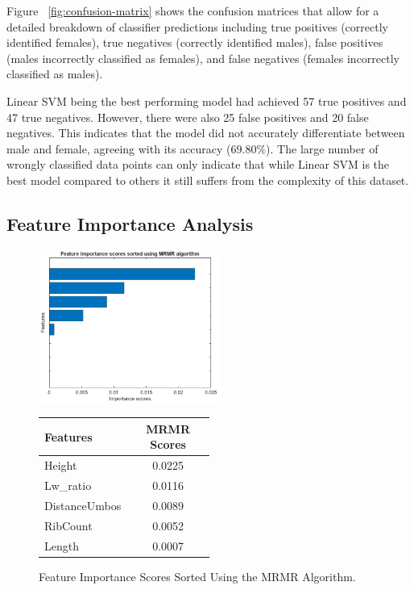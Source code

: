 Figure ~\ref{fig:confusion-matrix} shows the confusion matrices that allow for a detailed breakdown of classifier predictions including true positives (correctly identified females), true negatives (correctly identified males), false positives (males incorrectly classified as females), and false negatives (females incorrectly classified as males).

Linear SVM being the best performing model had achieved 57 true positives and 47 true negatives. However, there were also 25 false positives and 20 false negatives. This indicates that the model did not accurately differentiate  between male and female, agreeing with its accuracy (69.80\%). The large number of wrongly classified data points can only indicate that while Linear SVM is the best model compared to others it still suffers from the complexity of this dataset. 

\newpage
\subsection{Feature Importance Analysis}

\begin{figure}[!htbp]
	\centering
	\begin{minipage}{0.48\textwidth} 
		\centering
		\includegraphics[width=\textwidth, height=5cm]{figures/mrmr.png} 
	\end{minipage}%
	\hfill 
	\begin{minipage}{0.48\textwidth} 
		\centering
		{\fontsize{12}{15}\selectfont 
			\begin{tabular}{p{0.5\linewidth}c}
				\hline
				\textbf{Features} & \textbf{MRMR Scores} \\ \hline
				Height              & 0.0225  \\
				Lw\_ratio           & 0.0116  \\
				DistanceUmbos       & 0.0089  \\
				RibCount            & 0.0052  \\
				Length              & 0.0007  \\
				\hline
			\end{tabular}
		}
	\end{minipage}
	\caption{Feature Importance Scores Sorted Using the MRMR Algorithm.}
	\label{fig:mrmr-combined}
\end{figure}


